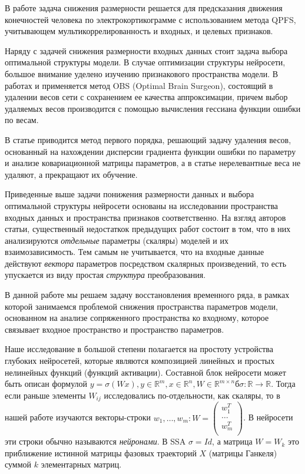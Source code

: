 \documentclass{article}
\begin{document}
В работе \citep{isachenko2022quadratic} задача снижения размерности решается для предсказания движения конечностей человека по электрокортикограмме с использованием  метода QPFS, учитывающем мультикоррелированность и входных, и целевых признаков.



Наряду с задачей снижения размерности входных данных стоит задача выбора оптимальной структуры модели. В случае оптимизации структуры нейросети, большое внимание уделено изучению признакового пространства модели. В работах \citep{hassibi1993optimal} и \citep{dong2017learning} применяется метод OBS (Optimal Brain Surgeon), состоящий в удалении весов сети с сохранением ее качества аппроксимации, причем выбор удаляемых весов производится с помощью вычисления гессиана функции ошибки по весам.

В статье \citep{грабовой2019определение} приводится метод первого порядка, решающий задачу удаления весов, основанный на нахождении дисперсии градиента функции ошибки по параметру и анализе ковариационной матрицы параметров, а в статье \citep{грабовой2020введение} нерелевантные веса не удаляют, а прекращают их обучение.


Приведенные выше задачи понижения размерности данных и выбора оптимальной структуры нейросети основаны на исследовании пространства входных данных и пространства признаков соответственно. На взгляд авторов статьи, существенный недостаткок предыдущих работ состоит в том, что в них анализируются \textit{отдельные} параметры (скаляры) моделей и их взаимозависимость. Тем самым не учитывается, что на входные данные действуют \textit{вектора} параметров посредством скалярных произведений, то есть упускается из виду простая \textit{структура} преобразования.

В данной работе мы решаем задачу восстановления временного ряда, в рамках которой занимаемся проблемой снижения пространства параметров модели, основанном на анализе сопряженного пространства ко входному, которое связывает входное пространство и пространство параметров. 

Наше исследование в большой степени полагается на простоту устройства глубоких нейросетей, которые являются композицией линейных и простых нелинейных функций (функций активации). Составной блок нейросети может быть описан формулой  $y=\sigma(Wx), y \in \mathbb{R}^m, x \in \mathbb{R}^n, W \in \mathbb{R}^{m \times n}б \sigma: \mathbb{R} \to \mathbb{R}$. Тогда если раньше элементы $W_{ij}$ исследовались по-отдельности, как скаляры, то в нашей работе изучаются векторы-строки $w_1, \dots, w_m: W = \begin{pmatrix}
w_1^T\\
\dots\\
w_m^T\\
\end{pmatrix}$. В нейросети эти строки обычно называются \textit{нейронами}. В SSA $\sigma = Id$, а матрица $W=W_k$ это приближение истинной матрицы фазовых траекторий $X$ (матрицы Ганкеля) суммой $k$ элементарных матриц.
\end{document}
